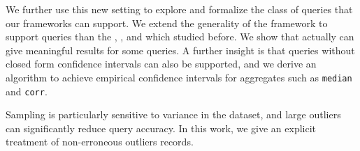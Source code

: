 We further use this new setting to explore and formalize the class of queries that our frameworks can support.
We extend the generality of the framework to support queries than the \sumfunc, \avgfunc, and \countfunc which studied before.
We show that \nsc actually can give meaningful results for some \selectfunc queries.
A further insight is that queries without closed form confidence intervals can also be supported, and we
derive an algorithm to achieve empirical confidence intervals for aggregates such as \texttt{median} and \texttt{corr}.

Sampling is particularly sensitive to variance in the dataset, and large outliers can significantly reduce query accuracy.
In this work, we give an explicit treatment of non-erroneous outliers records.




